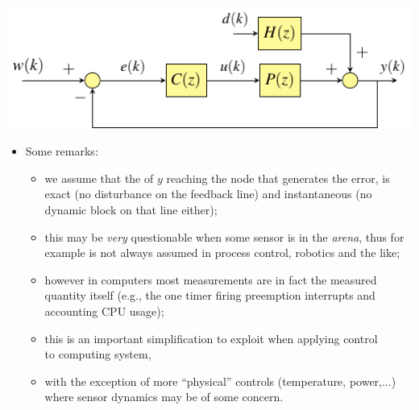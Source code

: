 \begin{frame}
\framesubtitleTC{}
 \begin{center}
  \includegraphics[width=0.40\columnwidth]{./Unit-04/img/ControlLoop.pdf}
 \end{center}
 \begin{itemize}[<+-| alert@+>]
 \item \vspace{-2mm} Some remarks:
       \begin{itemize}[<+-| alert@+>]
       \item we assume that the  of $y$ reaching the node that generates the error,
             is exact (no disturbance on the feedback line) and instantaneous (no dynamic block
             on that line either);
       \item this may be \emph{very} questionable when some sensor is in the \emph{arena}, thus for\\
             example is not always assumed in process control, robotics and the like;
       \item however in computers most measurements are in fact the measured\\
             quantity itself (e.g., the one timer firing preemption interrupts and\\
             accounting CPU usage);
       \item this is an important simplification to exploit when applying control\\
             to computing system,
       \item with the exception of more ``physical'' controls (temperature, power,...)\\
             where sensor dynamics may be of some concern.
       \end{itemize}
 \end{itemize}
\end{frame}

